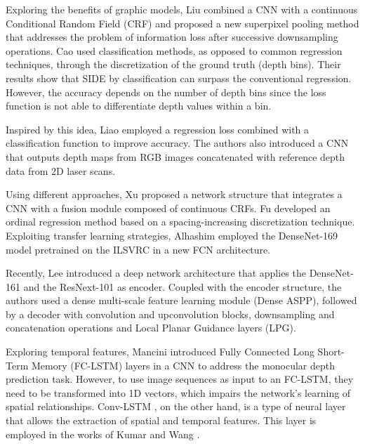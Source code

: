 \documentclass[5p]{elsarticle}
\begin{document}
Exploring the benefits of graphic models, Liu \etal \cite{liu2015deep} combined a CNN with a continuous Conditional Random Field (CRF) and proposed a new superpixel pooling method that addresses the problem of information loss after successive downsampling operations. Cao \etal \cite{cao2017estimating} used classification methods, as opposed to common regression techniques, through the discretization of the ground truth (depth bins). Their results show that SIDE by classification can surpass the conventional regression. However, the accuracy depends on the number of depth bins since the loss function is not able to differentiate depth values within a bin. 

Inspired by this idea, Liao \etal \cite{liao2017parse} employed a regression loss combined with a classification function to improve accuracy. The authors also introduced a CNN that outputs depth maps from RGB images concatenated with reference depth data from 2D laser scans. 

Using different approaches, Xu \etal \cite{xu2017multi} proposed a network structure that integrates a CNN with a fusion module composed of continuous CRFs. Fu \etal \cite{fu2018deep} developed an ordinal regression method based on a spacing-increasing discretization technique. Exploiting transfer learning strategies, Alhashim \etal \cite{alhashim2018high} employed the DenseNet-169 \cite{huang2017densely} model pretrained on the ILSVRC \cite{russakovsky2015imagenet} in a new FCN architecture. 

Recently, Lee \etal \cite{lee2019big} introduced a deep network architecture that applies the DenseNet-161 \cite{huang2017densely} and the ResNext-101 \cite{xie2017aggregated} as encoder. Coupled with the encoder structure, the authors used a dense multi-scale feature learning module (Dense ASPP), followed by a decoder with convolution and upconvolution blocks, downsampling and concatenation operations and Local Planar Guidance layers (LPG). 

Exploring temporal features, Mancini \etal \cite{mancini2017toward} introduced Fully Connected Long Short-Term Memory (FC-LSTM) \cite{hochreiter1997long} layers in a CNN to address the monocular depth prediction task. However, to use image sequences as input to an FC-LSTM, they need to be transformed into 1D vectors, which impairs the network's learning of spatial relationships. Conv-LSTM \cite{xingjian2015convolutional}, on the other hand, is a type of neural layer that allows the extraction of spatial and temporal features. This layer is employed in the works of Kumar \etal \cite{cs2018depthnet} and Wang \etal \cite{wang2019recurrent}.
\end{document}
